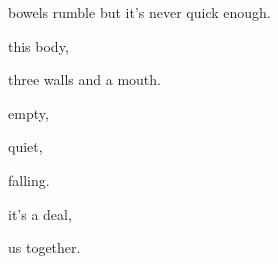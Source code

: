 \documentclass[extrafontsizes, 48pt]{memoir}
\newcommand\blankpage{%
    \null
    \thispagestyle{empty}%
    \addtocounter{page}{-1}%
    \newpage}
\begin{document}
	\begin{minipage}{.6\textwidth}
	bowels rumble but it's never quick enough.
	\afterpage{\blankpage}
	\end{minipage}
	\newpage

	\begin{minipage}{.6\textwidth}
	this body,
	\end{minipage}
	\newpage

	\begin{minipage}{.6\textwidth}
	three walls and a mouth.
	\end{minipage}
	\newpage

	\begin{minipage}{.6\textwidth}
	empty,
	\end{minipage}
	\newpage

	\begin{minipage}{.6\textwidth}
	quiet,
	\end{minipage}
	\newpage

	\begin{minipage}{.6\textwidth}
	falling.
	\afterpage{\blankpage}
	\end{minipage}
	\newpage

	\begin{minipage}{.6\textwidth}
	it's a deal,
	\end{minipage}
	\newpage

	\begin{minipage}{.6\textwidth}
	us together.
	\end{minipage}
	\newpage
\end{document}
